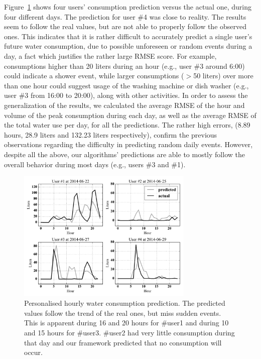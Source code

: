 Figure~\ref{figure8} shows four users' consumption prediction versus the actual one, during four different days. The prediction for user \#4 was close to reality. The results seem to follow the real values, but are not able to properly follow the observed ones. This indicates that it is rather difficult to accurately predict a single user's future water consumption, due to possible unforeseen or random events during a day, a fact which justifies the rather large RMSE score. For example, consumptions higher than 20 liters during an hour (e.g., user \#3 around 6:00) could indicate a shower event, while larger consumptions ($>$50 liters) over more than one hour could suggest usage of the washing machine or dish washer (e.g., user \#3 from 16:00 to 20:00), along with other activities. In order to assess the generalization of the results, we calculated the average RMSE of the hour and volume of the peak consumption during each day, as well as the average RMSE of the total water use per day, for all the predictions. The rather high errors, (8.89 hours, 28.9 liters and 132.23 liters respectively), confirm the previous observations regarding the difficulty in predicting random daily events. However, despite all the above, our algorithms' predictions are able to mostly follow the overall behavior during most days (e.g., users \#3 and \#1). 

\begin{figure}[h!]
	\centering
	\includegraphics[width=0.75\textwidth]{figures/figure8.pdf}
	\caption{Personalised hourly water consumption prediction. The predicted values follow the trend of the real ones, but miss sudden events. This is apparent during 16 and 20 hours for \#user1 and during 10 and 15 hours for \#user3. \#user2 had very little consumption during that day and our framework predicted that no consumption will occur.}	
	\label{figure8}
\end{figure}

